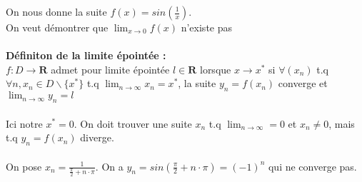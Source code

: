 \documentclass{article}
\begin{document}
On nous donne la suite $ f(x) = sin(\frac{1}{x}) $.\\
On veut démontrer que $ \lim_{x\to{0}} f(x) $ n'existe pas\\\\
\textbf{Définiton de la limite épointée :}\\
$ f : D \to \mathbf{R} $ admet pour limite épointée $ l \in \mathbf{R} $ lorsque $ x \to x^* $ si $ \forall (x_n) $ t.q $ \forall n, x_n \in D \backslash \{x^*\} $ t.q $ \lim_{n\to\infty} x_n = x^*$, la suite $ y_n = f(x_n) $ converge et $ \lim_{n\to\infty} y_n = l$\\\\
Ici notre $ x^* = 0 $. On doit trouver une suite $ x_n $ t.q $ \lim_{n\to\infty} = 0 $ et $ x_n \neq 0$, mais t.q $ y_n = f(x_n) $ diverge.\\\\
On pose $ x_n = \frac{1}{\frac{\pi}{2} + n \cdot \pi}$. On a $ y_n = sin(\frac{\pi}{2} + n \cdot \pi) = (-1)^n $ qui ne converge pas.
\end{document}

